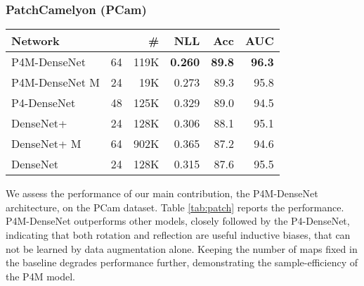 \documentclass{llncs}
\begin{document}
\subsubsection{PatchCamelyon (PCam)}

\begin{SCtable}[]

\centering

\begin{tabular}{@{}lrrrrr@{}}
\toprule
Network &  & \#  &  NLL & Acc& AUC\\ 
\midrule

P4M-DenseNet   & 64 & 119K  & \textbf{0.260}  & \textbf{89.8}       &   \textbf{96.3 }  \\
P4M-DenseNet M & 24 & 19K  & 0.273   & 89.3            &   95.8  \\
P4-DenseNet    & 48 & 125K  & 0.329   & 89.0             &   94.5         \\
DenseNet+      & 24 & 128K  & 0.306    & 88.1            &   95.1          \\
DenseNet+   M  & 64 & 902K  & 0.365   & 87.2             & 94.6      \\
DenseNet       & 24 & 128K  & 0.315   & 87.6             &   95.5          \\
 \bottomrule
 
\end{tabular}



\caption{Performance on PCam, measured by negative log-likelihood, accuracy and AUC. Experiments with additional data augmentation with 90 rotations and reflections are marked by . \textit{M} indicates matching number of  maps, \# number of weights,  number of  maps per layer.}

\label{tab:patch}

\end{SCtable}

We assess the performance of our main contribution, the P4M-DenseNet architecture, on the PCam dataset. Table \ref{tab:patch} reports the performance. P4M-DenseNet outperforms other models, closely followed by the P4-DenseNet, indicating that both rotation and reflection are useful inductive biases, that can not be learned by data augmentation alone. Keeping the number of  maps fixed in the baseline degrades performance further, demonstrating the sample-efficiency of the P4M model.
\end{document}
